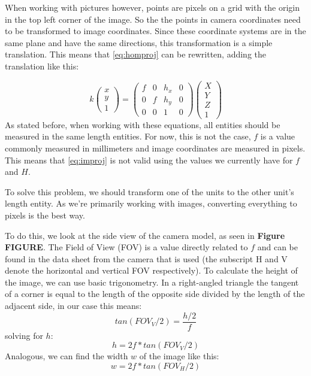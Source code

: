 When working with pictures however, points are pixels on a grid with the origin in the top left corner of the image. So the the points in camera coordinates need to be transformed to image coordinates. Since these coordinate systems are in the same plane and have the same directions, this transformation is a simple translation. This means that \autoref{eq:homproj} can be rewritten, adding the translation like this:

\begin{equation}\label{eq:improj}
    k
    \begin{pmatrix}
        x \\ y \\ 1
    \end{pmatrix} = 
    \begin{pmatrix}
        f & 0 & h_x & 0\\ 
        0 & f & h_y & 0\\ 
        0 & 0 & 1 & 0
    \end{pmatrix}
    \begin{pmatrix}
        X \\ Y \\ Z \\ 1
    \end{pmatrix}
\end{equation}
As stated before, when working with these equations, all entities should be measured in the same length entities. For now, this is not the case, $f$ is a value commonly measured in millimeters and image coordinates are measured in pixels. This means that \autoref{eq:improj} is not valid using the values we currently have for $f$ and $H$.\bigskip

To solve this problem, we should transform one of the units to the other unit's length entity. As we're primarily working with images, converting everything to pixels is the best way.\bigskip

To do this, we look at the side view of the camera model, as seen in \textbf{Figure FIGURE}. The Field of View (FOV) is a value directly related to $f$ and can be found in the data sheet from the camera that is used (the subscript H and V denote the horizontal and vertical FOV respectively). To calculate the height of the image, we can use basic trigonometry. In a right-angled triangle the tangent of a corner is equal to the length of the opposite side divided by the length of the adjacent side, in our case this means:
\begin{equation}
    tan(FOV_V/2) = \frac{h/2}{f}
\end{equation}\label{eq:fovv}
solving for $h$:
\begin{equation}
    h = 2f*tan(FOV_V/2)
\end{equation}
Analogous, we can find the width $w$ of the image like this:
\begin{equation}\label{eq:fovh}
    w = 2f*tan(FOV_H/2)
\end{equation}

